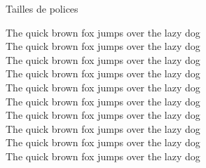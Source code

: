 \begin{frame}{Tailles de polices}

   {\tiny         The quick brown fox jumps over the lazy dog}\\
   {\scriptsize   The quick brown fox jumps over the lazy dog}\\
   {\footnotesize The quick brown fox jumps over the lazy dog}\\
   {\small        The quick brown fox jumps over the lazy dog}\\
   {\normalsize   The quick brown fox jumps over the lazy dog}\\
   {\large        The quick brown fox jumps over the lazy dog}\\
   {\Large        The quick brown fox jumps over the lazy dog}\\
   {\LARGE        The quick brown fox jumps over the lazy dog}\\
   {\huge         The quick brown fox jumps over the lazy dog}\\
   {\Huge         The quick brown fox jumps over the lazy dog}

\end{frame}

